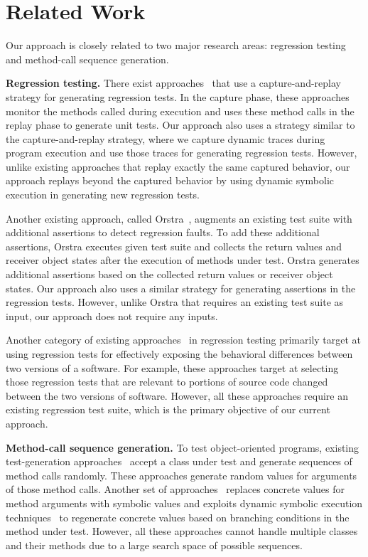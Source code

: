 \section{Related Work}
\label{sec:related}

Our approach is closely related to two major research areas: regression testing and method-call sequence generation.

\textbf{Regression testing.} There exist approaches~\cite{Elbaum:capture, orso:capture, david:java} that use a capture-and-replay strategy for generating regression tests. In the capture phase, these approaches monitor the methods called during execution and uses these method calls in the replay phase to generate unit tests. Our approach also uses a strategy similar to the capture-and-replay strategy, where we capture dynamic traces during program execution and use those traces for generating regression tests. However, unlike existing approaches that replay exactly the same captured behavior, our approach replays beyond the captured behavior by using dynamic symbolic execution in generating new regression tests.

Another existing approach, called Orstra~\cite{xie06:augmenting}, augments an existing test suite with additional assertions to detect regression faults. To add these additional assertions, Orstra executes given test suite and collects the return values and receiver object states after the execution of methods under test. Orstra generates additional assertions based on the collected return values or receiver object states. Our approach also uses a similar strategy for generating assertions in the regression tests. However, unlike Orstra that requires an existing test suite as input, our approach does not require any inputs.

Another category of existing approaches~\cite{DeMillo91:constraint, taneja08:diffgen, evans07:differential} in regression testing primarily target at using regression tests for effectively exposing the behavioral differences between two versions of a software. For example, these approaches target at selecting those regression tests that are relevant to portions of source code changed between the two versions of software. However, all these approaches require an existing regression test suite, which is the primary objective of our current approach.

\textbf{Method-call sequence generation.} To test object-oriented programs, existing test-generation approaches~\cite{csallner:jcrasher, JTEST, pacheco:eclat, xie:rostra} accept a class under test and generate sequences of method calls randomly. These approaches generate random values for arguments of those method calls. Another set of approaches~\cite{inkumsah08:improving} replaces concrete values for method arguments with symbolic values and exploits dynamic symbolic execution techniques~\cite{Clarke:symbolic, godefroid:dart, king:symex, koushik:cute} to regenerate concrete values based on branching conditions in the method under test. However, all these approaches cannot handle multiple classes and their methods due to a large search space of possible sequences.

